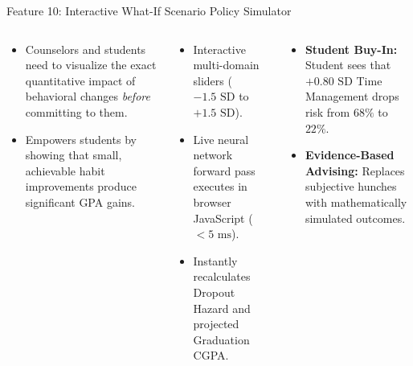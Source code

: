 \documentclass[aspectratio=169,10pt]{beamer}
\newcommand{\whybox}[2]{
  \begin{tcolorbox}[colframe=whyframe,colbacktitle=whyframe,colback=whybg,title=\textbf{WHY? The Problem \& Need (#1)}]
  \scriptsize #2
  \end{tcolorbox}
}
\newcommand{\howbox}[2]{
  \begin{tcolorbox}[colframe=howframe,colbacktitle=howframe,colback=howbg,title=\textbf{HOW? The Technology \& Algorithms (#1)}]
  \scriptsize #2
  \end{tcolorbox}
}
\newcommand{\outbox}[2]{
  \begin{tcolorbox}[colframe=outframe,colbacktitle=outframe,colback=outbg,title=\textbf{OUTCOMES? Measurable Impact \& Results (#1)}]
  \scriptsize #2
  \end{tcolorbox}
}
\begin{document}
\begin{frame}{Feature 10: Interactive What-If Scenario Policy Simulator}
\begin{columns}[T]
\begin{column}{0.32\textwidth}
\whybox{The Exploratory Need}{
\begin{itemize}
    \item Counselors and students need to visualize the exact quantitative impact of behavioral changes \textit{before} committing to them.
    \item Empowers students by showing that small, achievable habit improvements produce significant GPA gains.
\end{itemize}
}
\end{column}

\begin{column}{0.32\textwidth}
\howbox{Real-Time Sensitivity Engine}{
\begin{itemize}
    \item Interactive multi-domain sliders ($-1.5\text{ SD}$ to $+1.5\text{ SD}$).
    \item Live neural network forward pass executes in browser JavaScript ($<5\text{ ms}$).
    \item Instantly recalculates Dropout Hazard and projected Graduation CGPA.
\end{itemize}
}
\end{column}

\begin{column}{0.32\textwidth}
\outbox{Collaborative Goal Setting}{
\begin{itemize}
    \item \textbf{Student Buy-In:} Student sees that $+0.80\text{ SD}$ Time Management drops risk from $68\%$ to $22\%$.
    \item \textbf{Evidence-Based Advising:} Replaces subjective hunches with mathematically simulated outcomes.
\end{itemize}
}
\end{column}
\end{columns}
\end{frame}
\end{document}
